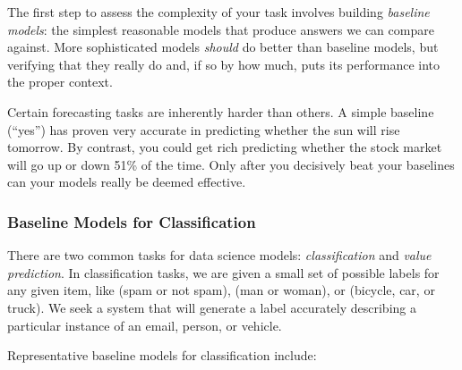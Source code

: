 \documentclass[10pt]{article}
\begin{document}
The first step to assess the complexity of your task involves building \textit{baseline models}: the simplest reasonable models that produce answers we can compare against. More sophisticated models \textit{should} do better than baseline models, but verifying that they really do and, if so by how much, puts its performance into the proper context.

Certain forecasting tasks are inherently harder than others. A simple baseline (“yes”) has proven very accurate in predicting whether the sun will rise tomorrow. By contrast, you could get rich predicting whether the stock market will go up or down 51\% of the time. Only after you decisively beat your baselines can your models really be deemed effective.

\subsubsection{Baseline Models for Classification}

There are two common tasks for data science models: \textit{classification} and \textit{value prediction}. In classification tasks, we are given a small set of possible labels for any given item, like (spam or not spam), (man or woman), or (bicycle, car, or truck). We seek a system that will generate a label accurately describing a particular instance of an email, person, or vehicle.

Representative baseline models for classification include:
\end{document}
